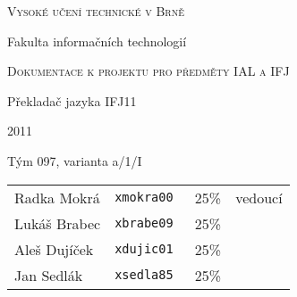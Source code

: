 \thispagestyle{empty}

\begin{center}
\Large{\scshape Vysoké učení technické v Brně}

\vspace{0.5cm}

\large{Fakulta informačních technologií}

\vfill

\Large{\scshape Dokumentace k projektu pro předměty IAL a IFJ}

%

\vfill

\LARGE{Překladač jazyka IFJ11}

2011

\vfill

\large{Tým 097, varianta a/1/I}
\end{center}

\vspace{0.5cm}

\begin{tabular}{l l r l}
Radka Mokrá  & \tt{xmokra00} & 25\% & vedoucí \\ 
Lukáš Brabec & \tt{xbrabe09} & 25\% & \\
Aleš Dujíček & \tt{xdujic01} & 25\% & \\
Jan Sedlák   & \tt{xsedla85} & 25\% & \\
\end{tabular}


\newpage{}
